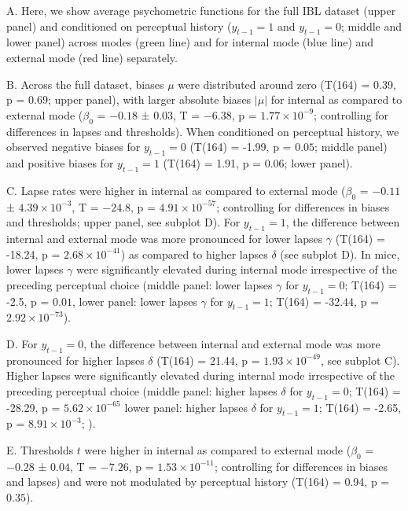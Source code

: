 \documentclass[
]{article}
\begin{document}
\begin{itemize}
A. Here, we show average psychometric functions for the full IBL dataset
(upper panel) and conditioned on perceptual history (\(y_{t-1} = 1\) and
\(y_{t-1} = 0\); middle and lower panel) across modes (green line) and
for internal mode (blue line) and external mode (red line) separately.

B. Across the full dataset, biases \(\mu\) were distributed around zero
(T(164) = 0.39, p = \(0.69\); upper panel), with larger absolute biases
\(|\mu|\) for internal as compared to external mode (\(\beta_0\) =
\(-0.18\) ± \(0.03\), T = \(-6.38\), p =
\(\ensuremath{1.77\times 10^{-9}}\); controlling for differences in
lapses and thresholds). When conditioned on perceptual history, we
observed negative biases for \(y_{t-1} = 0\) (T(164) = -1.99, p =
\(0.05\); middle panel) and positive biases for \(y_{t-1} = 1\) (T(164)
= 1.91, p = \(0.06\); lower panel).

C. Lapse rates were higher in internal as compared to external mode
(\(\beta_0\) = \(-0.11\) ± \(\ensuremath{4.39\times 10^{-3}}\), T =
\(-24.8\), p = \(\ensuremath{4.91\times 10^{-57}}\); controlling for
differences in biases and thresholds; upper panel, see subplot D). For
\(y_{t-1} = 1\), the difference between internal and external mode was
more pronounced for lower lapses \(\gamma\) (T(164) = -18.24, p =
\(\ensuremath{2.68\times 10^{-41}}\)) as compared to higher lapses
\(\delta\) (see subplot D). In mice, lower lapses \(\gamma\) were
significantly elevated during internal mode irrespective of the
preceding perceptual choice (middle panel: lower lapses \(\gamma\) for
\(y_{t-1} = 0\); T(164) = -2.5, p = \(0.01\), lower panel: lower lapses
\(\gamma\) for \(y_{t-1} = 1\); T(164) = -32.44, p =
\(\ensuremath{2.92\times 10^{-73}}\)).

D. For \(y_{t-1} = 0\), the difference between internal and external
mode was more pronounced for higher lapses \(\delta\) (T(164) = 21.44, p
= \(\ensuremath{1.93\times 10^{-49}}\), see subplot C). Higher lapses
were significantly elevated during internal mode irrespective of the
preceding perceptual choice (middle panel: higher lapses \(\delta\) for
\(y_{t-1} = 0\); T(164) = -28.29, p =
\(\ensuremath{5.62\times 10^{-65}}\) lower panel: higher lapses
\(\delta\) for \(y_{t-1} = 1\); T(164) = -2.65, p =
\(\ensuremath{8.91\times 10^{-3}}\); ).

E. Thresholds \(t\) were higher in internal as compared to external mode
(\(\beta_0\) = \(-0.28\) ± \(0.04\), T = \(-7.26\), p =
\(\ensuremath{1.53\times 10^{-11}}\); controlling for differences in
biases and lapses) and were not modulated by perceptual history (T(164)
= 0.94, p = \(0.35\)).


\end{itemize}
\end{document}
